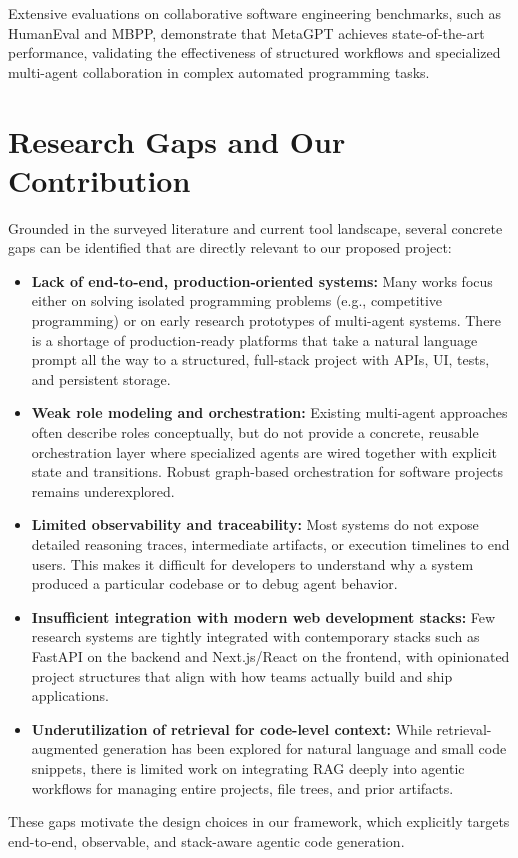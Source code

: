 Extensive evaluations on collaborative software engineering benchmarks, such as HumanEval and MBPP, demonstrate that MetaGPT achieves state-of-the-art performance, validating the effectiveness of structured workflows and specialized multi-agent collaboration in complex automated programming tasks.

\section{Research Gaps and Our Contribution}

Grounded in the surveyed literature and current tool landscape, several concrete gaps can be identified that are directly relevant to our proposed project:

\begin{itemize}
    \item \textbf{Lack of end-to-end, production-oriented systems:} Many works focus either on solving isolated programming problems (e.g., competitive programming) or on early research prototypes of multi-agent systems. There is a shortage of production-ready platforms that take a natural language prompt all the way to a structured, full-stack project with APIs, UI, tests, and persistent storage.
    \item \textbf{Weak role modeling and orchestration:} Existing multi-agent approaches often describe roles conceptually, but do not provide a concrete, reusable orchestration layer where specialized agents are wired together with explicit state and transitions. Robust graph-based orchestration for software projects remains underexplored.
    \item \textbf{Limited observability and traceability:} Most systems do not expose detailed reasoning traces, intermediate artifacts, or execution timelines to end users. This makes it difficult for developers to understand why a system produced a particular codebase or to debug agent behavior.
    \item \textbf{Insufficient integration with modern web development stacks:} Few research systems are tightly integrated with contemporary stacks such as FastAPI on the backend and Next.js/React on the frontend, with opinionated project structures that align with how teams actually build and ship applications.
    \item \textbf{Underutilization of retrieval for code-level context:} While retrieval-augmented generation has been explored for natural language and small code snippets, there is limited work on integrating RAG deeply into agentic workflows for managing entire projects, file trees, and prior artifacts.
\end{itemize}

These gaps motivate the design choices in our framework, which explicitly targets end-to-end, observable, and stack-aware agentic code generation.